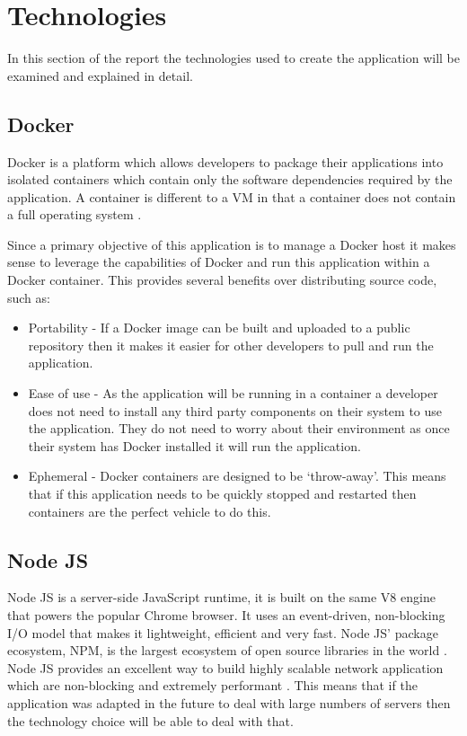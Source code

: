 \section{Technologies}
\label{sec:technologies}
In this section of the report the technologies used to create the application will be examined and explained in detail.
\subsection{Docker}
\gls{Docker} is a platform which allows developers to package their applications into isolated containers which contain only the software dependencies required by the application. A container is different to a \gls{VM} in that a container does not contain a full operating system \citep{WhatDocker}.

Since a primary objective of this application is to manage a \gls{Docker host} it makes sense to leverage the capabilities of Docker and run this application within a \gls{Docker container}. This provides several benefits over distributing source code, such as:

\begin{itemize}
	\item Portability - If a \gls{Docker image} can be built and uploaded to a public repository then it makes it easier for other developers to pull and run the application.
	\item Ease of use - As the application will be running in a container a developer does not need to install any third party components on their system to use the application. They do not need to worry about their environment as once their system has Docker installed it will run the application.
	\item Ephemeral - Docker containers are designed to be `throw-away'. This means that if this application needs to be quickly stopped and restarted then containers are the perfect vehicle to do this.
\end{itemize}

\subsection{Node JS}
\label{sub:nodejs}
Node JS is a server-side JavaScript runtime, it is built on the same V8 engine that powers the popular Chrome browser. It uses an event-driven, non-blocking I/O model that makes it lightweight, efficient and very fast. Node JS' package ecosystem, NPM, is the largest ecosystem of open source libraries in the world \citep{Nodejs.org2016}. Node JS provides an excellent way to build highly scalable network application which are non-blocking and extremely performant \citep{Griffin2011}. This means that if the application was adapted in the future to deal with large numbers of servers then the technology choice will be able to deal with that.

